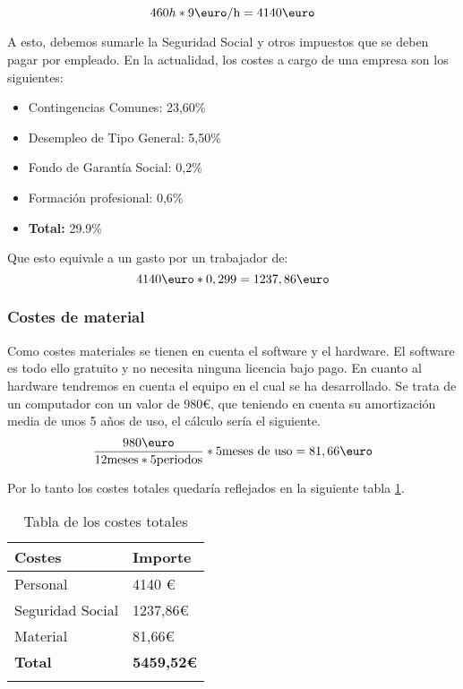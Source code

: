 \[ 460h * 9\textrm{\euro/h} = 4140\textrm{\euro}\]

A esto, debemos sumarle la Seguridad Social y otros impuestos que se deben pagar por empleado. En la actualidad, los costes a cargo de una empresa son los siguientes:

\begin{itemize}
\item Contingencias Comunes: 23,60\%
\item Desempleo de Tipo General: 5,50\%
\item Fondo de Garantía Social: 0,2\%
\item Formación profesional: 0,6\%
\item \textbf{Total:} 29.9\%
\end{itemize}

Que esto equivale a un gasto por un trabajador de: 
\[ 4140\textrm{\euro} * 0,299 = 1237,86\textrm{\euro}\]
\subsubsection{Costes de material}

Como costes materiales se tienen en cuenta el software y el hardware. El software es todo ello gratuito y no necesita ninguna licencia bajo pago. En cuanto al hardware tendremos en cuenta el equipo en el cual se ha desarrollado. Se trata de un computador con un valor de 980\euro, que teniendo en cuenta su amortización media de unos 5 años de uso, el cálculo sería el siguiente. 
\[ \frac{980\textrm{\euro}}{12\textrm{meses} * 5 \textrm{periodos}} *5\textrm{meses de uso} = 81,66\textrm{\euro}\]
 
Por lo tanto los costes totales quedaría reflejados en la siguiente tabla \ref{tab:costes}.

\begin{table}[]
\centering
{}
\begin{tabular}{p{4cm} p{2cm}}
\toprule
Costes & Importe \\ \midrule
Personal         & 4140 \euro{}   \\ 
Seguridad Social & 1237,86\euro{} \\ 
Material         & 81,66\euro{}   \\ 
\textbf{Total}   & \textbf{5459,52\euro{}} \\ \bottomrule
\caption{Tabla de los costes totales}
\label{tab:costes}

\end{tabular}
\end{table}


